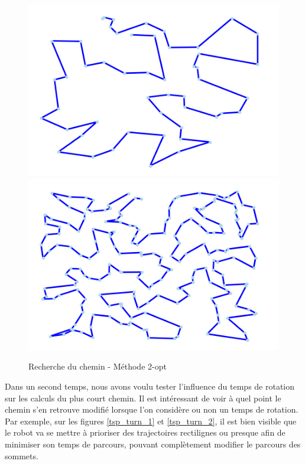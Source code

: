 \documentclass{article}
\begin{document}
\begin{figure}[h!]
	\includegraphics[scale=0.4]{image/Exmple50dechet.png}
	\includegraphics[scale=0.4]{image/Exemple200dechet.png}
	\caption{Recherche du chemin - Méthode 2-opt}
	\label{2-opt_dechet}
\end{figure}

Dans un second temps, nous avons voulu tester l'influence du temps de rotation sur les calculs du plus court chemin. Il est intéressant de voir à quel 
point le chemin s'en retrouve modifié lorsque l'on considère ou non un temps de rotation. Par exemple, sur les figures \ref{tsp_turn_1} et \ref{tsp_turn_2}, il est bien visible que le robot va se mettre à prioriser des trajectoires rectilignes ou presque afin de minimiser son temps de parcours, pouvant complètement modifier le parcours des sommets.
\end{document}
